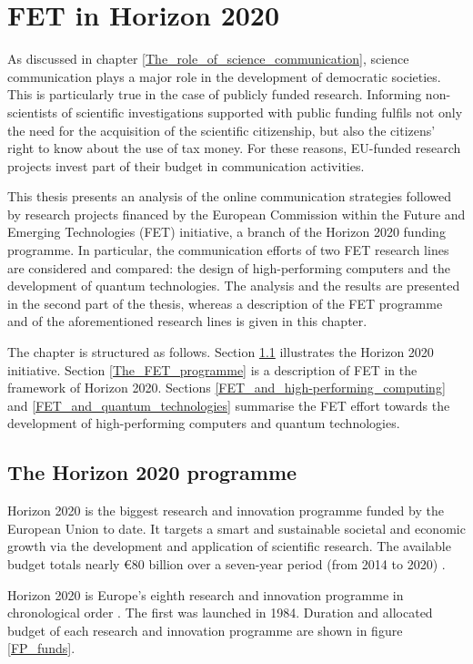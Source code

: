 \chapter{FET in Horizon 2020}
As discussed in chapter \ref{The_role_of_science_communication}, science communication plays a major role in the development of democratic societies. This is particularly true in the case of publicly funded research. Informing non-scientists of scientific investigations supported with public funding fulfils not only the need for the acquisition of the scientific citizenship, but also the citizens' right to know about the use of tax money. For these reasons, EU-funded research projects invest part of their budget in communication activities. 

This thesis presents an analysis of the online communication strategies followed by research projects financed by the European Commission within the Future and Emerging Technologies (FET) initiative, a branch of the Horizon 2020 funding programme. In particular, the communication efforts of two FET research lines are considered and compared: the design of high-performing computers and the development of quantum technologies. The analysis and the results are presented in the second part of the thesis, whereas a description of the FET programme and of the aforementioned research lines is given in this chapter. 

The chapter is structured as follows. Section \ref{The_Horizon_2020_programme} illustrates the Horizon 2020 initiative. Section \ref{The_FET_programme} is a description of FET in the framework of Horizon 2020. Sections \ref{FET_and_high-performing_computing} and \ref{FET_and_quantum_technologies} summarise the FET effort towards the development of high-performing computers and quantum technologies.

\section{The Horizon 2020 programme} \label{The_Horizon_2020_programme}
Horizon 2020 is the biggest research and innovation programme funded by the European Union to date. It targets a smart and sustainable societal and economic growth via the development and application of scientific research. The available budget totals nearly \euro 80 billion over a seven-year period (from 2014 to 2020) \cite{Horizon2020}.

Horizon 2020 is Europe's eighth research and innovation programme in chronological order \cite{FP4,FP5,FP6,FP7}. The first was launched in 1984. Duration and allocated budget of each research and innovation programme are shown in figure \ref{FP_funds}.

